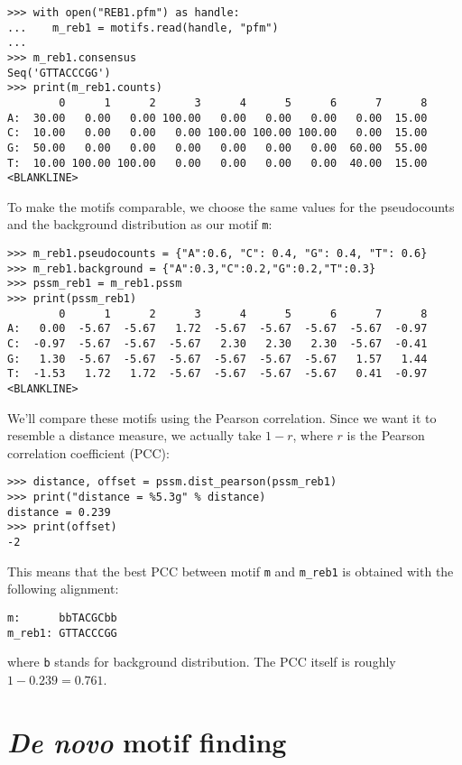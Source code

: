 \begin{verbatim}
>>> with open("REB1.pfm") as handle:
...    m_reb1 = motifs.read(handle, "pfm")
...
>>> m_reb1.consensus
Seq('GTTACCCGG')
>>> print(m_reb1.counts)
        0      1      2      3      4      5      6      7      8
A:  30.00   0.00   0.00 100.00   0.00   0.00   0.00   0.00  15.00
C:  10.00   0.00   0.00   0.00 100.00 100.00 100.00   0.00  15.00
G:  50.00   0.00   0.00   0.00   0.00   0.00   0.00  60.00  55.00
T:  10.00 100.00 100.00   0.00   0.00   0.00   0.00  40.00  15.00
<BLANKLINE>
\end{verbatim}

To make the motifs comparable, we choose the same values for the pseudocounts and the background distribution as our motif \verb|m|:

\begin{verbatim}
>>> m_reb1.pseudocounts = {"A":0.6, "C": 0.4, "G": 0.4, "T": 0.6}
>>> m_reb1.background = {"A":0.3,"C":0.2,"G":0.2,"T":0.3}
>>> pssm_reb1 = m_reb1.pssm
>>> print(pssm_reb1)
        0      1      2      3      4      5      6      7      8
A:   0.00  -5.67  -5.67   1.72  -5.67  -5.67  -5.67  -5.67  -0.97
C:  -0.97  -5.67  -5.67  -5.67   2.30   2.30   2.30  -5.67  -0.41
G:   1.30  -5.67  -5.67  -5.67  -5.67  -5.67  -5.67   1.57   1.44
T:  -1.53   1.72   1.72  -5.67  -5.67  -5.67  -5.67   0.41  -0.97
<BLANKLINE>
\end{verbatim}
We'll compare these motifs using the Pearson correlation.
Since we want it to resemble a distance measure, we actually take
$1-r$, where $r$ is the Pearson correlation coefficient (PCC):

\begin{verbatim}
>>> distance, offset = pssm.dist_pearson(pssm_reb1)
>>> print("distance = %5.3g" % distance)
distance = 0.239
>>> print(offset)
-2
\end{verbatim}
This means that the best PCC between motif \verb|m| and  \verb|m_reb1| is obtained with the following alignment:
\begin{verbatim}
m:      bbTACGCbb
m_reb1: GTTACCCGG
\end{verbatim}
where \verb|b| stands for background distribution. The PCC itself is
roughly $1-0.239=0.761$.

\section{\emph{De novo} motif finding}
\label{sec:find}

